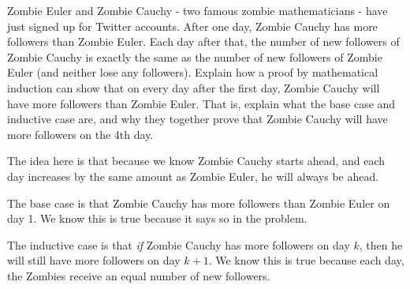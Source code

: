 \begin{questions}







\question Zombie Euler and Zombie Cauchy - two famous zombie mathematicians - have just signed up for Twitter accounts.  After one day, Zombie Cauchy has more followers than Zombie Euler.  Each day after that, the number of new followers of Zombie Cauchy is exactly the same as the number of new followers of Zombie Euler (and neither lose any followers).  Explain how a proof by mathematical induction can show that on every day after the first day, Zombie Cauchy will have more followers than Zombie Euler.  That is, explain what the base case and inductive case are, and why they together prove that Zombie Cauchy will have more followers on the 4th day.

\begin{solution}
  The idea here is that because we know Zombie Cauchy starts ahead, and each day increases by the same amount as Zombie Euler, he will always be ahead.
  
   The base case is that Zombie Cauchy has more followers than Zombie Euler on day 1.  We know this is true because it says so in the problem.
    
    The inductive case is that {\em if} Zombie Cauchy has more followers on day $k$, then he will still have more followers on day $k+1$.  We know this is true because each day, the Zombies receive an equal number of new followers. 
    

\end{solution}
\end{questions}
